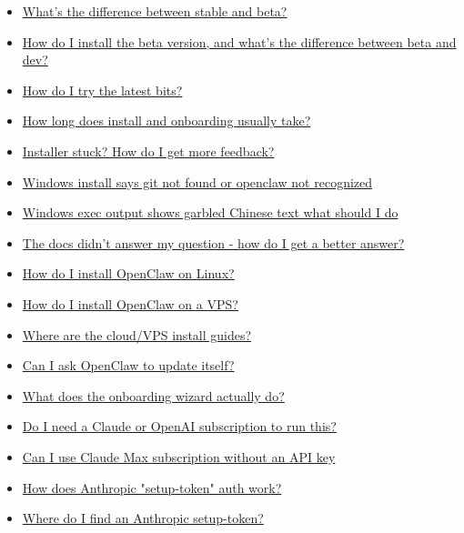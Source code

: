 \begin{itemize}
  \item \href{\#whats-the-difference-between-stable-and-beta}{What's the difference between stable and beta?}
  \item \href{\#how-do-i-install-the-beta-version-and-whats-the-difference-between-beta-and-dev}{How do I install the beta version, and what's the difference between beta and dev?}
  \item \href{\#how-do-i-try-the-latest-bits}{How do I try the latest bits?}
  \item \href{\#how-long-does-install-and-onboarding-usually-take}{How long does install and onboarding usually take?}
  \item \href{\#installer-stuck-how-do-i-get-more-feedback}{Installer stuck? How do I get more feedback?}
  \item \href{\#windows-install-says-git-not-found-or-openclaw-not-recognized}{Windows install says git not found or openclaw not recognized}
  \item \href{\#windows-exec-output-shows-garbled-chinese-text-what-should-i-do}{Windows exec output shows garbled Chinese text what should I do}
  \item \href{\#the-docs-didnt-answer-my-question-how-do-i-get-a-better-answer}{The docs didn't answer my question - how do I get a better answer?}
  \item \href{\#how-do-i-install-openclaw-on-linux}{How do I install OpenClaw on Linux?}
  \item \href{\#how-do-i-install-openclaw-on-a-vps}{How do I install OpenClaw on a VPS?}
  \item \href{\#where-are-the-cloudvps-install-guides}{Where are the cloud/VPS install guides?}
  \item \href{\#can-i-ask-openclaw-to-update-itself}{Can I ask OpenClaw to update itself?}
  \item \href{\#what-does-the-onboarding-wizard-actually-do}{What does the onboarding wizard actually do?}
  \item \href{\#do-i-need-a-claude-or-openai-subscription-to-run-this}{Do I need a Claude or OpenAI subscription to run this?}
  \item \href{\#can-i-use-claude-max-subscription-without-an-api-key}{Can I use Claude Max subscription without an API key}
  \item \href{\#how-does-anthropic-setuptoken-auth-work}{How does Anthropic "setup-token" auth work?}
  \item \href{\#where-do-i-find-an-anthropic-setuptoken}{Where do I find an Anthropic setup-token?}

\end{itemize}
